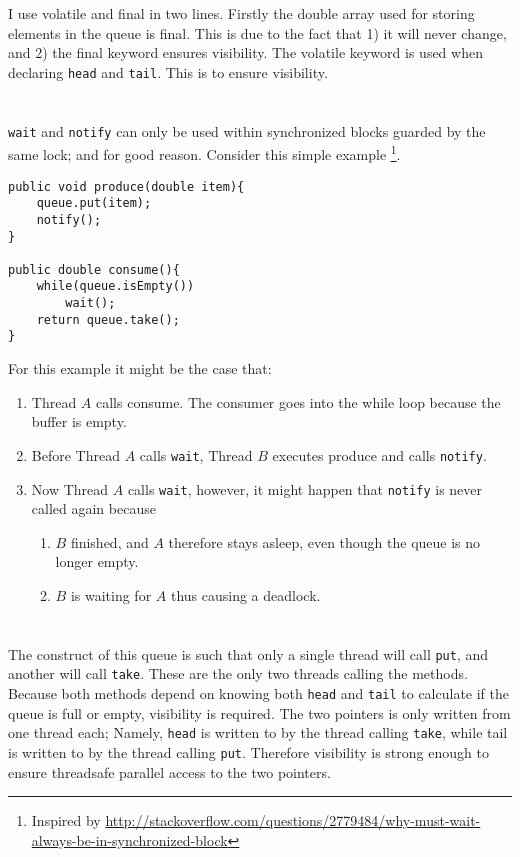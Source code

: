 \documentclass{ituhandin}
\begin{document}
I use volatile and final in two lines. Firstly the double array used for storing elements in the queue is final. This is due to the fact that 1) it will never change, and 2) the final keyword ensures visibility. The volatile keyword is used when declaring \texttt{head} and \texttt{tail}. This is to ensure visibility. 

\section{} %
\texttt{wait} and \texttt{notify} can only be used within synchronized blocks guarded by the same lock; and for good reason. Consider this simple example \footnote{Inspired by \url{http://stackoverflow.com/questions/2779484/why-must-wait-always-be-in-synchronized-block}}.

\begin{lstlisting}[frame={}]
public void produce(double item){
    queue.put(item);
    notify();
}

public double consume(){
    while(queue.isEmpty())
        wait();
    return queue.take();
}
\end{lstlisting}
For this example it might be the case that: 
\begin{enumerate}
        \item Thread $A$ calls consume. The consumer goes into the while loop because the buffer is empty.
        \item Before Thread $A$ calls \texttt{wait}, Thread $B$ executes produce and calls \texttt{notify}.
        \item Now Thread $A$ calls \texttt{wait}, however, it might happen that \texttt{notify} is never called again because
        \begin{enumerate}
            \item $B$ finished, and $A$ therefore stays asleep, even though the queue is no longer empty. 
            \item $B$ is waiting for $A$ thus causing a deadlock.
        \end{enumerate}
\end{enumerate}
\section{} %
The construct of this queue is such that only a single thread will call \texttt{put}, and another will call \texttt{take}. These are the only two threads calling the methods. Because both methods depend on knowing both \texttt{head} and \texttt{tail} to calculate if the queue is full or empty, visibility is required. 
The two pointers is only written from one thread each; Namely, \texttt{head} is written to by the thread calling \texttt{take}, while tail is written to by the thread calling \texttt{put}. Therefore visibility is strong enough to ensure threadsafe parallel access to the two pointers. 
\end{document}
